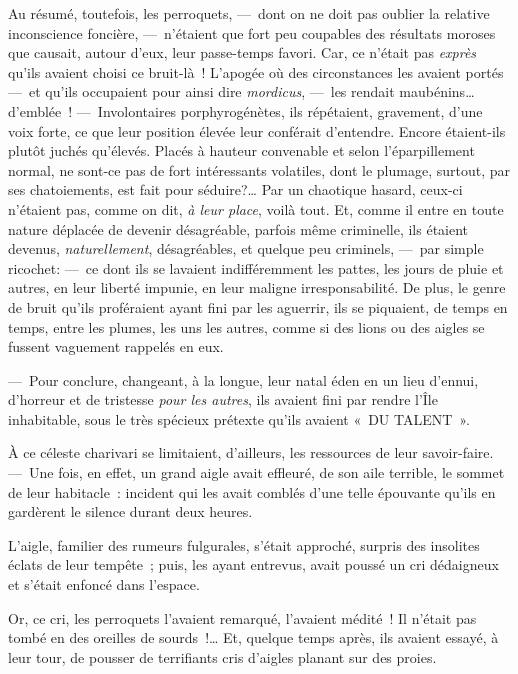 \documentclass[french,twoside]{book} %
\begin{document}
Au résumé, toutefois, les perroquets, — dont on ne doit pas oublier la relative inconscience foncière, — n’étaient que fort peu coupables des résultats moroses que causait, autour d’eux, leur passe-temps favori. Car, ce n’était pas \emph{exprès} qu’ils avaient choisi ce bruit-là ! L’apogée où des circonstances les avaient portés — et qu’ils occupaient pour ainsi dire \emph{mordicus}, — les rendait maubénins… d’emblée ! — Involontaires porphyrogénètes, ils répétaient, gravement, d’une voix forte, ce que leur position élevée leur conférait d’entendre. Encore étaient-ils plutôt juchés qu’élevés. Placés à hauteur convenable et selon l’éparpillement normal, ne sont-ce pas de fort intéressants volatiles, dont le plumage, surtout, par ses chatoiements, est fait pour séduire?… Par un chaotique hasard, ceux-ci n’étaient pas, comme on dit, \emph{à leur place},   voilà tout. Et, comme il entre en toute nature déplacée de devenir désagréable, parfois même criminelle, ils étaient devenus, \emph{naturellement}, désagréables, et quelque peu criminels, — par simple ricochet: — ce dont ils se lavaient indifféremment les pattes, les jours de pluie et autres, en leur liberté impunie, en leur maligne irresponsabilité. De plus, le genre de bruit qu’ils proféraient ayant fini par les aguerrir, ils se piquaient, de temps en temps, entre les plumes, les uns les autres, comme si des lions ou des aigles se fussent vaguement rappelés en eux.\par
— Pour conclure, changeant, à la longue, leur natal éden en un lieu d’ennui, d’horreur et de tristesse \emph{pour les autres}, ils avaient fini par rendre l’Île inhabitable, sous le très spécieux prétexte qu’ils avaient « DU TALENT ».\par
À ce céleste charivari se limitaient, d’ailleurs, les ressources de leur savoir-faire. — Une fois, en effet, un grand aigle avait effleuré, de son aile terrible, le sommet de leur habitacle : incident   qui les avait comblés d’une telle épouvante qu’ils en gardèrent le silence durant deux heures.\par
L’aigle, familier des rumeurs fulgurales, s’était approché, surpris des insolites éclats de leur tempête ; puis, les ayant entrevus, avait poussé un cri dédaigneux et s’était enfoncé dans l’espace.\par
Or, ce cri, les perroquets l’avaient remarqué, l’avaient médité ! Il n’était pas tombé en des oreilles de sourds !… Et, quelque temps après, ils avaient essayé, à leur tour, de pousser de terrifiants cris d’aigles planant sur des proies.\par
\end{document}
